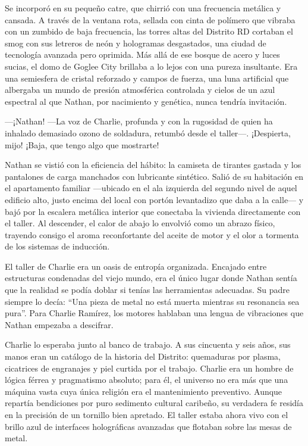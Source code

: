 \documentclass[11pt,twoside]{book}
\begin{document}
Se incorporó en su pequeño catre, que chirrió con una frecuencia metálica y cansada. A través de la ventana rota, sellada con cinta de polímero que vibraba con un zumbido de baja frecuencia, las torres altas del Distrito RD cortaban el smog con sus letreros de neón y hologramas desgastados, una ciudad de tecnología avanzada pero oprimida. Más allá de ese bosque de acero y luces sucias, el domo de Goglee City brillaba a lo lejos con una pureza insultante. Era una semiesfera de cristal reforzado y campos de fuerza, una luna artificial que albergaba un mundo de presión atmosférica controlada y cielos de un azul espectral al que Nathan, por nacimiento y genética, nunca tendría invitación.

---¡Nathan! ---La voz de Charlie, profunda y con la rugosidad de quien ha inhalado demasiado ozono de soldadura, retumbó desde el taller---. ¡Despierta, mijo! ¡Baja, que tengo algo que mostrarte!

Nathan se vistió con la eficiencia del hábito: la camiseta de tirantes gastada y los pantalones de carga manchados con lubricante sintético. Salió de su habitación en el apartamento familiar ---ubicado en el ala izquierda del segundo nivel de aquel edificio alto, justo encima del local con portón levantadizo que daba a la calle--- y bajó por la escalera metálica interior que conectaba la vivienda directamente con el taller. Al descender, el calor de abajo lo envolvió como un abrazo físico, trayendo consigo el aroma reconfortante del aceite de motor y el olor a tormenta de los sistemas de inducción.

El taller de Charlie era un oasis de entropía organizada. Encajado entre estructuras condenadas del viejo mundo, era el único lugar donde Nathan sentía que la realidad se podía doblar si tenías las herramientas adecuadas. Su padre siempre lo decía: ``Una pieza de metal no está muerta mientras su resonancia sea pura''. Para Charlie Ramírez, los motores hablaban una lengua de vibraciones que Nathan empezaba a descifrar.

Charlie lo esperaba junto al banco de trabajo. A sus cincuenta y seis años, sus manos eran un catálogo de la historia del Distrito: quemaduras por plasma, cicatrices de engranajes y piel curtida por el trabajo. Charlie era un hombre de lógica férrea y pragmatismo absoluto; para él, el universo no era más que una máquina vasta cuya única religión era el mantenimiento preventivo. Aunque repartía bendiciones por puro sedimento cultural caribeño, su verdadera fe residía en la precisión de un tornillo bien apretado. El taller estaba ahora vivo con el brillo azul de interfaces holográficas avanzadas que flotaban sobre las mesas de metal.
\end{document}
